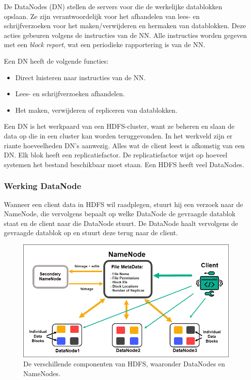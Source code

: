 \documentclass[a4paper,10pt,twoside]{report}
\begin{document}
De DataNodes (DN) stellen de servers voor die de werkelijke datablokken opslaan. Ze zijn verantwoordelijk voor het afhandelen van lees- en schrijfverzoeken voor het maken/verwijderen en hermaken van datablokken. Deze acties gebeuren volgens de instructies van de NN. Alle instructies worden gegeven met een \textit{block report}, wat een periodieke rapportering is van de NN.

Een DN heeft de volgende functies:

\begin{itemize}
	\item Direct luisteren naar instructies van de NN.
	\item Lees- en schrijfverzoeken afhandelen.
	\item Het maken, verwijderen of repliceren van datablokken.
\end{itemize}

Een DN is het werkpaard van een HDFS-cluster, want ze beheren en slaan de data op die in een cluster kan worden teruggevonden. In het werkveld zijn er riante hoeveelheden DN's aanwezig. Alles wat de client leest is afkomstig van een DN. Elk blok heeft een replicatiefactor. De replicatiefactor wijst op hoeveel systemen het bestand beschikbaar moet staan. Een HDFS heeft veel DataNodes.

\subsubsection{Werking DataNode}

Wanneer een client data in HDFS wil raadplegen, stuurt hij een verzoek naar de NameNode, die vervolgens bepaalt op welke DataNode de gevraagde datablok staat en de client naar die DataNode stuurt. De DataNode haalt vervolgens de gevraagde datablok op en stuurt deze terug naar de client.

\begin{figure}
	\includegraphics[width=\linewidth]{images/hdfs-components-namenode-datanode-datanode.png}
	\caption{De verschillende componenten van HDFS, waaronder DataNodes en NameNodes.}
\end{figure}
\end{document}
